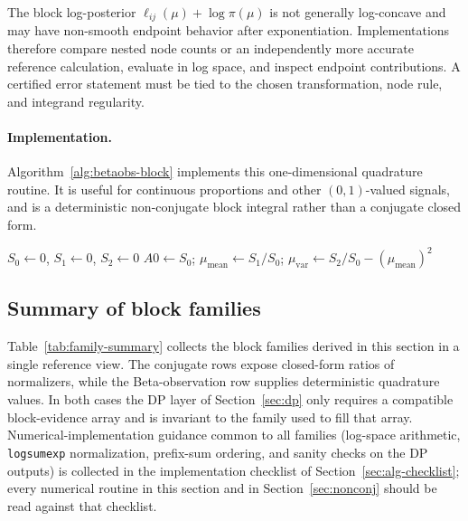 \begin{remark}
\label{rem:beta-quadrature-stability}
The block log-posterior $\ell_{ij}(\mu)+\log\pi(\mu)$ is not generally log-concave and may have
non-smooth endpoint behavior after exponentiation. Implementations therefore compare nested node
counts or an independently more accurate reference calculation, evaluate in log space, and inspect
endpoint contributions. A certified error statement must be tied to the chosen transformation,
node rule, and integrand regularity.
\end{remark}

\paragraph{Implementation.}
Algorithm~\ref{alg:betaobs-block} implements this one-dimensional quadrature routine. It is useful for continuous proportions and other $(0,1)$-valued signals, and is a deterministic non-conjugate block integral rather than a conjugate closed form.

\begin{algorithm}[H]
\caption{BetaObsBlock$(y,\phi,i,j,a_0,b_0,\{\mu_g,w_g\}_{g=1}^G)$}
\label{alg:betaobs-block}
\KwIn{Block $(i,j]$; observations $y_{i+1:j}\in(0,1)$; known precisions $\phi_{i+1:j}$; Beta prior $(a_0,b_0)$; quadrature nodes $\{\mu_g,w_g\}$}
$S_0\leftarrow 0$, $S_1\leftarrow 0$, $S_2\leftarrow 0$\;
$A0\leftarrow S_0$;\quad
$\mu_{\text{mean}}\leftarrow S_1/S_0$;\quad
$\mu_{\text{var}}\leftarrow S_2/S_0 - (\mu_{\text{mean}})^2$\;
\end{algorithm}

\subsection{Summary of block families}
\label{sec:families-summary}
Table~\ref{tab:family-summary} collects the block families derived in this section in a single
reference view. The conjugate rows expose closed-form ratios of normalizers, while the
Beta-observation row supplies deterministic quadrature values. In both cases the DP layer of
Section~\ref{sec:dp} only requires a compatible block-evidence array and is invariant to the
family used to fill that array. Numerical-implementation guidance common to all families
(log-space arithmetic, \texttt{logsumexp} normalization, prefix-sum ordering, and sanity checks
on the DP outputs) is collected in the implementation checklist of
Section~\ref{sec:alg-checklist}; every numerical routine in this section and in
Section~\ref{sec:nonconj} should be read against that checklist.

